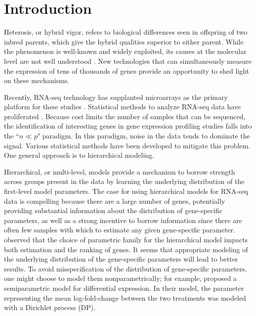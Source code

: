 \section{Introduction}
Heterosis, or hybrid vigor, refers to biological differences seen in offspring of two inbred parents, which give the hybrid qualities superior to either parent. While the phenomenon is well-known and widely exploited, its causes at the molecular level are not well understood \citep{paschold}. New technologies that can simultaneously measure the expression of tens of thousands of genes provide an opportunity to shed light on these mechanisms.

Recently, RNA-seq technology has supplanted microarrays as the primary platform for these studies \citep{wang2009rna}. Statistical methods to analyze RNA-seq data have proliferated \citep{voom,deseq2014,mccarthy,liu,landau}. Because cost limits the number of samples that can be sequenced, the identification of interesting genes in gene expression profiling studies falls into the ``$n \ll p$" paradigm. In this paradigm, noise in the data tends to dominate the signal. Various statistical methods have been developed to mitigate this problem. One general approach is to hierarchical modeling.

Hierarchical, or multi-level, models provide a mechanism to borrow strength across groups present in the data by learning the underlying distribution of the first-level model parameters. The case for using hierarchical models for RNA-seq data is compelling because there are a large number of genes, potentially providing substantial information about the distribution of gene-specific parameters, as well as a strong incentive to borrow information since there are often few samples with which to estimate any given gene-specific parameter. \citet{niemi} observed that the choice of parametric family for the hierarchical model impacts both estimation and the ranking of genes. It seems that appropriate modeling of the underlying distribution of the gene-specific parameters will lead to better results. To avoid misspecification of the distribution of gene-specific parameters, one might choose to model them nonparametrically; for example, \citet{liu} proposed a semiparametric model for differential expression. In their model, the parameter representing the mean log-fold-change between the two treatments was modeled with a Dirichlet process (DP).

